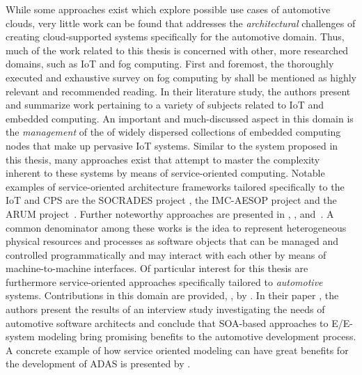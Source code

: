 While some approaches exist which explore possible use cases of automotive clouds, very little work can be found that addresses the \emph{architectural} challenges of creating cloud-supported systems specifically for the automotive domain.
Thus, much of the work related to this thesis is concerned with other, more researched domains, such as IoT and fog computing. First and foremost, the thoroughly executed and exhaustive survey on fog computing \cite{nath2018survey} by \citeauthor*{nath2018survey} shall be mentioned as highly relevant and recommended reading. In their literature study, the authors present and summarize work pertaining to a variety of subjects related to IoT and embedded computing.
An important and much-discussed aspect in this domain is the \emph{management} of the of widely dispersed collections of embedded computing nodes that make up pervasive IoT systems. Similar to the system proposed in this thesis, many approaches exist that attempt to master the complexity inherent to these systems by means of service-oriented computing. Notable examples of service-oriented architecture frameworks tailored specifically to the IoT and CPS are the SOCRADES project \cite{cannata2008socrades}, the IMC-AESOP project \cite{karnouskos2012soa} and the ARUM project~\cite{marin2013conceptual}.
Further noteworthy approaches are presented in \cite{butzin2016microservices}, \cite{kart2007distributed}, and~\cite{teixeira2011service}. 
A common denominator among these works is the idea to represent heterogeneous physical resources and processes as software objects that can be managed and controlled programmatically and may interact with each other by means of machine-to-machine interfaces.
Of particular interest for this thesis are furthermore service-oriented approaches specifically tailored to \emph{automotive} systems. Contributions in this domain are provided, \eg , by \citeauthor*{kugele2017service}. In their paper \cite{kugele2017service}, the authors present the results of an interview study investigating the needs of automotive software architects and conclude that SOA-based approaches to E/E-system modeling bring promising benefits to the automotive development process. A concrete example of how service oriented modeling can have great benefits for the development of ADAS is presented by \citeauthor*{wagner2014developing} \cite{wagner2014developing}. 



